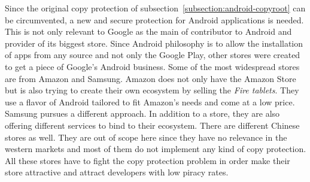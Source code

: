 Since the original copy protection of subsection~\ref{subsection:android-copyroot} can be circumvented, a new and secure protection for Android applications is needed.
This is not only relevant to Google as the main of contributor to Android and provider of its biggest store.
Since Android philosophy is to allow the installation of apps from any source and not only the Google Play, other stores were created to get a piece of Google's Android business.
Some of the most widespread stores are from Amazon and Samsung.
Amazon does not only have the Amazon Store but is also trying to create their own ecosystem by selling the \textit{Fire tablets}.
They use a flavor of Android tailored to fit Amazon's needs and come at a low price.
Samsung pursues a different approach.
In addition to a store, they are also offering different services to bind to their ecosystem.
There are different Chinese stores as well.
They are out of scope here since they have no relevance in the western markets and most of them do not implement any kind of copy protection.
\newline
All these stores have to fight the copy protection problem in order make their store attractive and attract developers with low piracy rates.
